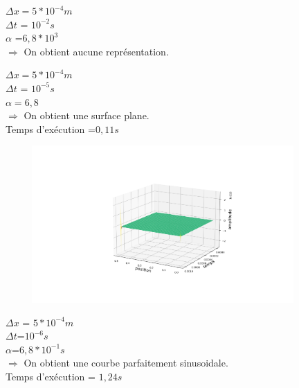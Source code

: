 \begin{enumerate}[label=\alph*)]
\begin{minipage}{.5\textwidth}%

\item $\Delta x =  5*{10}^{-4}m$\\
$\Delta t$ = ${10}^{-2} s $\\
$\alpha$ =$6,8*{10}^{3}$\\

$\Longrightarrow$ On obtient aucune représentation.

\end{minipage}


\begin{minipage}{.5\textwidth}%

\item $\Delta x = 5*{10}^{-4}m$\\
$\Delta t$ = ${10}^{-5} s $ \\
$\alpha =6,8$\\

$\Longrightarrow$ On obtient une surface plane.\\
Temps d'exécution =$0,11s$


\end{minipage}%
\hfill
\begin{minipage}{.45\textwidth}%
\includegraphics[width=12cm,height=6cm]{explicited.png}
\end{minipage}%

\begin{minipage}{.5\textwidth}%

\item $\Delta x$ = $5*{10}^{-4}m$\\
$\Delta t$=${10}^{-6} s $ \\
$\alpha$=$6,8*{10}^{-1}s$\\

$\Longrightarrow$ On obtient une courbe parfaitement sinusoidale.\\
Temps d'exécution = $1,24s$


\end{minipage}
\end{enumerate}
